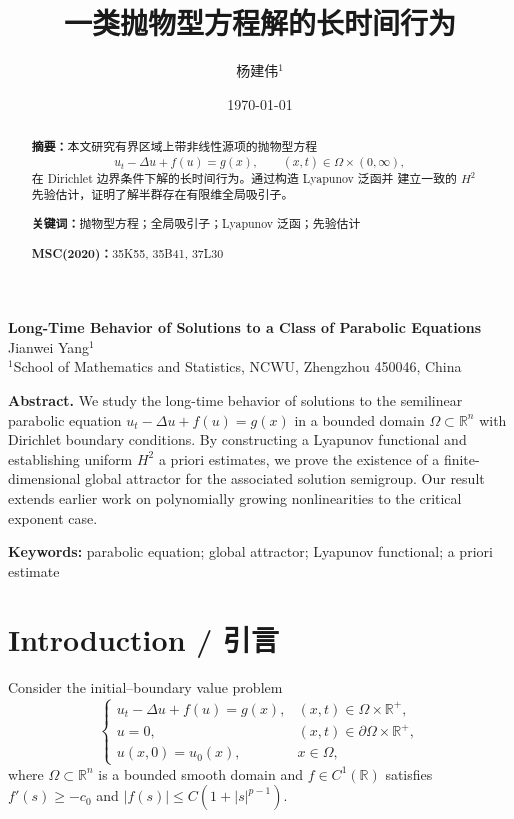 \documentclass[11pt,a4paper,UTF8,fontset=fandol]{ctexart}
\title{一类抛物型方程解的长时间行为}
\author{杨建伟$^{1}$}
\date{\today}
\newcommand{\R}{\mathbb{R}}
\newcommand{\Om}{\Omega}
\begin{document}
\maketitle

\begin{abstract}
\noindent\textbf{摘要：}本文研究有界区域上带非线性源项的抛物型方程
\begin{equation}\label{eq:p}
  u_t-\Delta u+f(u)=g(x), \qquad (x,t)\in\Om\times(0,\infty),
\end{equation}
在 Dirichlet 边界条件下解的长时间行为。通过构造 Lyapunov 泛函并
建立一致的 $H^2$ 先验估计，证明了解半群存在有限维全局吸引子。

\smallskip
\noindent\textbf{关键词：}抛物型方程；全局吸引子；Lyapunov 泛函；先验估计

\smallskip
\noindent\textbf{MSC(2020)：}35K55, 35B41, 37L30
\end{abstract}

\begin{center}
{\large\bfseries Long-Time Behavior of Solutions to a Class of
Parabolic Equations}\\[6pt]
{\normalsize Jianwei Yang$^{1}$}\\[3pt]
{\small $^{1}$School of Mathematics and Statistics, NCWU, Zhengzhou 450046, China}
\end{center}

\noindent\textbf{Abstract.} We study the long-time behavior of solutions
to the semilinear parabolic equation
$u_t-\Delta u+f(u)=g(x)$ in a bounded domain $\Om\subset\R^n$ with
Dirichlet boundary conditions. By constructing a Lyapunov functional
and establishing uniform $H^2$ a priori estimates, we prove the
existence of a finite-dimensional global attractor for the associated
solution semigroup. Our result extends earlier work on polynomially
growing nonlinearities to the critical exponent case.

\smallskip
\noindent\textbf{Keywords:} parabolic equation; global attractor;
Lyapunov functional; a priori estimate

\bigskip
\section{Introduction / 引言}

Consider the initial--boundary value problem
\begin{equation}\label{eq:ibvp}
  \begin{cases}
    u_t-\Delta u+f(u)=g(x), & (x,t)\in\Om\times\R^+,\\
    u=0, & (x,t)\in\partial\Om\times\R^+,\\
    u(x,0)=u_0(x), & x\in\Om ,
  \end{cases}
\end{equation}
where $\Om\subset\R^n$ is a bounded smooth domain and
$f\in C^1(\R)$ satisfies $f'(s)\ge -c_0$ and
$|f(s)|\le C(1+|s|^{p-1})$.
\end{document}
